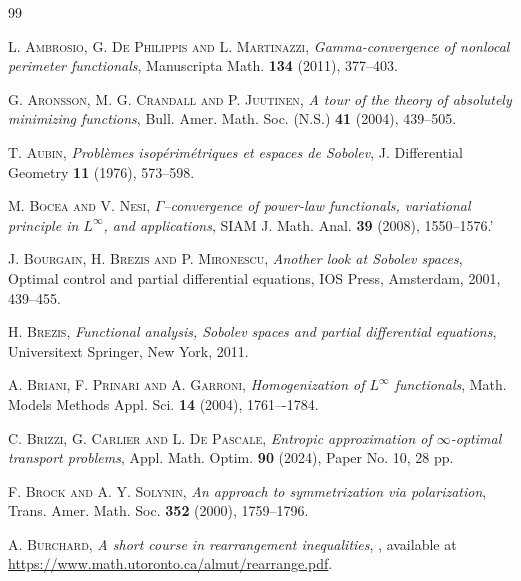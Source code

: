 \documentclass[11pt, reqno]{article}
\theoremstyle{definition}
\numberwithin{equation}{section}
\begin{document}
\begin{thebibliography}{99}


\textsc{L. Ambrosio, G. De Philippis and L. Martinazzi},
\emph{Gamma-convergence of nonlocal perimeter functionals},
Manuscripta Math. \textbf{134} (2011), 377--403.

\textsc{G. Aronsson, M. G. Crandall and P. Juutinen},
\emph{A tour of the theory of absolutely minimizing functions},
Bull. Amer. Math. Soc. (N.S.) \textbf{41} (2004), 439--505.

\textsc{T. Aubin},
\emph{Probl\`emes isop\'erim\'etriques et espaces de {S}obolev},
J. Differential Geometry \textbf{11} (1976), 573--598.



\textsc{M. Bocea and V. Nesi},
\emph{$\Gamma$--convergence of power-law functionals, variational principle in $L^\infty$, and applications},
SIAM J. Math. Anal. \textbf{39} (2008), 1550--1576.'

\textsc{J. Bourgain, H. Brezis and P. Mironescu},
\emph{Another look at Sobolev spaces},
Optimal control and partial differential equations,
IOS Press, Amsterdam, 2001,  439--455.

\textsc{H. Brezis},
\emph{Functional analysis, Sobolev spaces and partial differential equations},
Universitext
Springer, New York, 2011. 

\textsc{A. Briani, F. Prinari and A. Garroni},
\emph{Homogenization of $L^\infty$ functionals},
Math. Models Methods Appl. Sci. \textbf{14} (2004), 1761–-1784.

\textsc{C. Brizzi, G. Carlier and L. De Pascale},
\emph{Entropic approximation of {$\infty$}-optimal transport problems},
Appl. Math. Optim. \textbf{90} (2024), Paper No. 10, 28 pp.

\textsc{F. Brock and A. Y. Solynin},
\emph{An approach to symmetrization via polarization},
Trans. Amer. Math. Soc. \textbf{352} (2000), 1759--1796.

\textsc{A. Burchard},
\emph{A short course in rearrangement inequalities},
, available at \url{https://www.math.utoronto.ca/almut/rearrange.pdf}.


\end{thebibliography}
\end{document}
